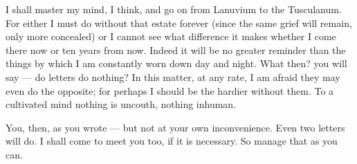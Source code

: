 

 I shall master my mind, I think, and go on from Lanuvium to the Tusculanum. For either I must do without that estate forever (since the same grief will remain, only more concealed) or I cannot see what difference it makes whether I come there now or ten years from now. Indeed it will be no greater reminder than the things by which I am constantly worn down day and night. What then? you will say --- do letters do nothing? In this matter, at any rate, I am afraid they may even do the opposite; for perhaps I should be the hardier without them. To a cultivated mind nothing is uncouth, nothing inhuman.

 You, then, as you wrote --- but not at your own inconvenience. Even two letters will do. I shall come to meet you too, if it is necessary. So manage that as you can.
